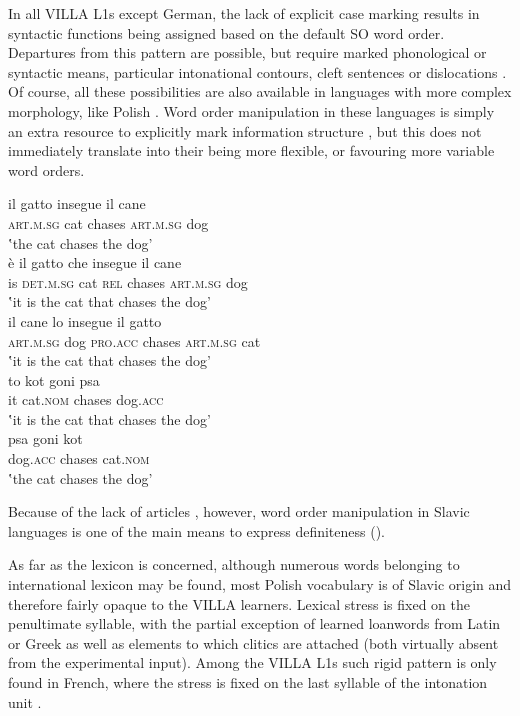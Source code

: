 In all VILLA L1s except German, the lack of explicit case marking results in syntactic functions being assigned based on the default SO word order. Departures from this pattern  are possible, but require marked phonological or syntactic means, particular intonational contours, cleft sentences  or dislocations . Of course, all these possibilities are also available in languages with more complex morphology, like Polish . Word order manipulation in these languages is simply an extra resource to explicitly mark information structure , but this does not immediately translate into their being more flexible, or favouring more variable word orders. 

\ea%
    \label{ex:02:6}
    \ea\label{ex:02:6a}
    \gll    il gatto insegue il cane\\
        \textsc{art.m.sg}  cat  chases \textsc{art.m.sg} dog\\
   \glt    ‛the cat chases the dog'\\
    \ex\label{ex:02:6b}
    \gll    è il gatto che insegue il cane\\
            is  \textsc{det.m.sg}  cat  \textsc{rel}  chases    \textsc{art.m.sg}  dog\\
\glt       ‛it is the cat that chases the dog'\\
    \ex\label{ex:02:6c}
    \gll    il cane lo insegue il gatto\\
            \textsc{art.m.sg}  dog  \textsc{pro.acc}  chases    \textsc{art.m.sg}  cat\\
   \glt    ‛it is the cat that chases the dog'\\
    \ex\label{ex:02:6d}
    \gll    to kot goni psa\\
            it  cat.\textsc{nom}  chases    dog.\textsc{acc}\\
     \glt    ‛it is the cat that chases the dog'\\
    \ex\label{ex:02:6e}
    \gll    psa goni kot\\
            dog.\textsc{acc}  chases    cat.\textsc{nom}\\
    \glt    ‛the cat chases the dog'\\
    \z
\z

Because of the lack of articles \citep{Dryer2013a}, however, word order manipulation in Slavic languages is one of the main means to express definiteness (\citealt{JacennikDryer1992, Siewierska1993}).

As far as the lexicon is concerned, although numerous words belonging to international lexicon may be found, most Polish vocabulary is of Slavic origin and therefore fairly opaque to the VILLA learners. Lexical stress is fixed on the penultimate syllable, with the partial exception of learned loanwords from Latin or Greek as well as elements to which clitics are attached (both virtually absent from the experimental input). Among the VILLA L1s such rigid pattern is only found in French, where the stress is fixed on the last syllable of the intonation unit \citep{FougeronSmith1993}. 

